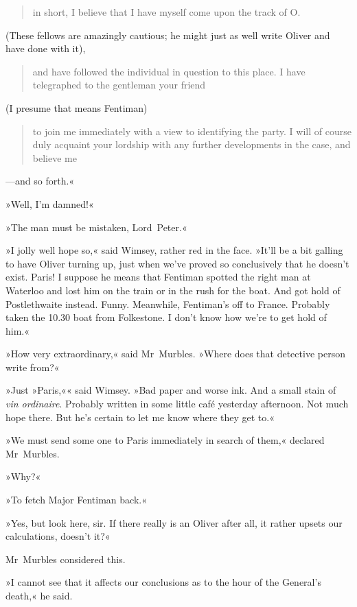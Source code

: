 \begin{quotation}
in short, I believe that I have myself come upon the track of O.
\end{quotation} 

(These fellows are amazingly cautious; he might just as well write Oliver and have done with it), 

\begin{quotation}
and have followed the individual in question to this place. I have telegraphed to the gentleman your friend
\end{quotation} 

(I presume that means Fentiman) 

\begin{quotation}to join me immediately with a view to identifying the party. I will of course duly acquaint your lordship with any further developments in the case, and believe me\end{quotation}—and so forth.«

»Well, I'm damned!«

»The man must be mistaken, Lord~Peter.«

»I jolly well hope so,« said Wimsey, rather red in the face. »It'll be a bit galling to have Oliver turning up, just when we've proved so conclusively that he doesn't exist. Paris! I suppose he means that Fentiman spotted the right man at Waterloo and lost him on the train or in the rush for the boat. And got hold of Postlethwaite instead. Funny. Meanwhile, Fentiman's off to France. Probably taken the 10.30 boat from Folkestone. I don't know how we're to get hold of him.«

»How very extraordinary,« said Mr~Murbles. »Where does that detective person write from?«

»Just »Paris,«« said Wimsey. »Bad paper and worse ink. And a small stain of \textit{vin ordinaire}. Probably written in some little café yesterday afternoon. Not much hope there. But he's certain to let me know where they get to.«

»We must send some one to Paris immediately in search of them,« declared Mr~Murbles.

»Why?«

»To fetch Major Fentiman back.«

»Yes, but look here, sir. If there really is an Oliver after all, it rather upsets our calculations, doesn't it?«

Mr~Murbles considered this.

»I cannot see that it affects our conclusions as to the hour of the General's death,« he said.

